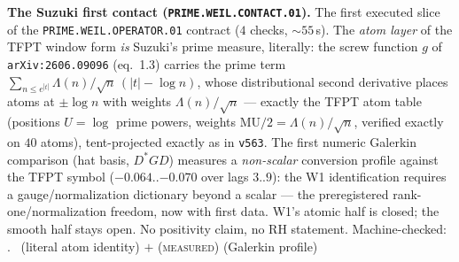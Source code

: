 \par\smallskip\noindent\textbf{The Suzuki first contact
(\texttt{PRIME.WEIL.CONTACT.01}).}
The first executed slice of the \texttt{PRIME.WEIL.OPERATOR.01}
contract ($4$ checks, ${\sim}55$\,s).  The \emph{atom layer} of the
TFPT window form \emph{is} Suzuki's prime measure, literally: the
screw function $g$ of \texttt{arXiv:2606.09096} (eq.~1.3) carries the
prime term $\sum_{n\le e^{|t|}}\Lambda(n)/\sqrt n\,(|t|-\log n)$,
whose distributional second derivative places atoms at $\pm\log n$
with weights $\Lambda(n)/\sqrt n$ --- exactly the TFPT atom table
(positions $U=\log$ prime powers, weights $\mathrm{MU}/2=
\Lambda(n)/\sqrt n$, verified exactly on $40$ atoms), tent-projected
exactly as in \texttt{v563}.  The first numeric Galerkin comparison
(hat basis, $D^*GD$) measures a \emph{non-scalar} conversion profile
against the TFPT symbol ($-0.064..{-0.070}$ over lags $3..9$): the W1
identification requires a gauge/normalization dictionary beyond a
scalar --- the preregistered rank-one/normalization freedom, now with
first data.  W1's atomic half is closed; the smooth half stays open.
No positivity claim, no RH statement.
Machine-checked: .
\mE\ (literal atom identity) $+$ (\textsc{measured}) (Galerkin profile)
\par\smallskip


